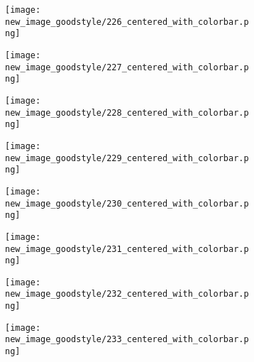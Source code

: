 \documentclass[a4paper,12pt]{article}
\begin{document}
\begin{figure}[H]
  \begin{subfigure}{0.11\textwidth}
    \texttt{[image: new\_image\_goodstyle/226\_centered\_with\_colorbar.png]}
  \end{subfigure}
  \hfill
  \begin{subfigure}{0.11\textwidth}
    \texttt{[image: new\_image\_goodstyle/227\_centered\_with\_colorbar.png]}
  \end{subfigure}
  \hfill
  \begin{subfigure}{0.11\textwidth}
    \texttt{[image: new\_image\_goodstyle/228\_centered\_with\_colorbar.png]}
  \end{subfigure}
  \hfill
  \begin{subfigure}{0.11\textwidth}
    \texttt{[image: new\_image\_goodstyle/229\_centered\_with\_colorbar.png]}
  \end{subfigure}
  \hfill
  \begin{subfigure}{0.11\textwidth}
    \texttt{[image: new\_image\_goodstyle/230\_centered\_with\_colorbar.png]}
  \end{subfigure}
  \hfill
  \begin{subfigure}{0.11\textwidth}
    \texttt{[image: new\_image\_goodstyle/231\_centered\_with\_colorbar.png]}
  \end{subfigure}
  \hfill
  \begin{subfigure}{0.11\textwidth}
    \texttt{[image: new\_image\_goodstyle/232\_centered\_with\_colorbar.png]}
  \end{subfigure}
  \hfill
  \begin{subfigure}{0.11\textwidth}
    \texttt{[image: new\_image\_goodstyle/233\_centered\_with\_colorbar.png]}
  \end{subfigure}
  \hfill
\end{figure}
\end{document}
